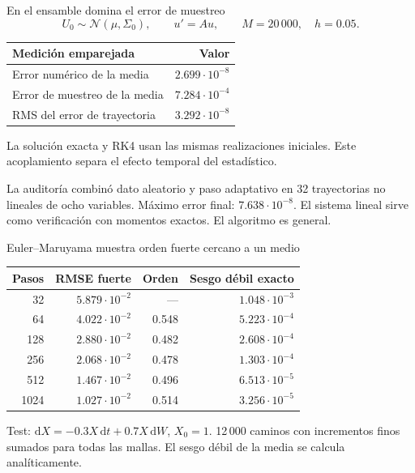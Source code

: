 \documentclass[aspectratio=169,11pt]{beamer}
\newcommand{\source}[1]{\vfill{\tiny\color{graytext}#1}}
\begin{document}
\begin{frame}{En el ensamble domina el error de muestreo}
\[
U_0\sim\mathcal N(\mu,\Sigma_0),\qquad u'=Au,\qquad
M=20\,000,\quad h=0.05.
\]
\renewcommand{\arraystretch}{1.4}
\small
\begin{tabularx}{0.98\linewidth}{@{}Xr@{}}\toprule
Medición emparejada & Valor\\\midrule
Error numérico de la media & $2.699\cdot10^{-8}$\\
Error de muestreo de la media & $7.284\cdot10^{-4}$\\
RMS del error de trayectoria & $3.292\cdot10^{-8}$\\\bottomrule
\end{tabularx}\par
\par\vspace{0.4cm}
La solución exacta y RK4 usan las mismas realizaciones iniciales.
Este acoplamiento separa el efecto temporal del estadístico.
\par\vspace{0.2cm}
\small La auditoría combinó dato aleatorio y paso adaptativo en 32 trayectorias
no lineales de ocho variables. Máximo error final: $7.638\cdot10^{-8}$.
\source{El sistema lineal sirve como verificación con momentos exactos. El algoritmo es general.}
\end{frame}

\begin{frame}{Euler--Maruyama muestra orden fuerte cercano a un medio}
\small\renewcommand{\arraystretch}{1.25}
\begin{tabular}{@{}rrrr@{}}\toprule
Pasos & RMSE fuerte & Orden & Sesgo débil exacto\\\midrule
32 & $5.879\cdot10^{-2}$ & --- & $1.048\cdot10^{-3}$\\
64 & $4.022\cdot10^{-2}$ & 0.548 & $5.223\cdot10^{-4}$\\
128 & $2.880\cdot10^{-2}$ & 0.482 & $2.608\cdot10^{-4}$\\
256 & $2.068\cdot10^{-2}$ & 0.478 & $1.303\cdot10^{-4}$\\
512 & $1.467\cdot10^{-2}$ & 0.496 & $6.513\cdot10^{-5}$\\
1024 & $1.027\cdot10^{-2}$ & 0.514 & $3.256\cdot10^{-5}$\\\bottomrule
\end{tabular}\par
\vspace{0.3cm}
\small Test: $\mathrm dX=-0.3X\,\mathrm dt+0.7X\,\mathrm dW$, $X_0=1$.
12\,000 caminos con incrementos finos sumados para todas las mallas.
El sesgo débil de la media se calcula analíticamente.
\end{frame}
\end{document}
